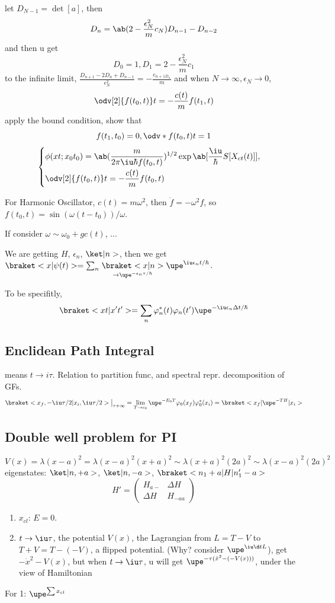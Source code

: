 let $D_{N-1} = \det[a]$, then
\[
  D_n = \ab(2 - \frac{\epsilon_N^2}{m}c_N)D_{n-1} - D_{n-2}
\]
and then u get
\[
  D_0 = 1, D_1 = 2 - \frac{\epsilon_N^2}{m}c_1
\]
to the infinite limit,
$\frac{D_{n+1} - 2D_n + D_{n-1}}{\epsilon_N^2} = -\frac{c_{n+1D_n}}{m}$
and when $N \to \infty, \epsilon_N \to 0$,
\[
  \odv[2]{f(t_0,t)}t = -\frac{c(t)}{m}f(t_1,t)
\]
apply the bound condition, show that
\[
  f(t_1,t_0) = 0,
  \odv*{f(t_0,t)}t = 1
\]
\[
  \begin{cases}
  \begin{aligned}
    & \phi(xt;x_0t_0) =
    \ab(\frac{m}{2\pi\iu\hbar f(t_0,t)})^{1/2}
    \exp\ab[\frac\iu\hbar S[X_{ct}(t)]],\\
    & \odv[2]{f(t_0,t)}t = -\frac{c(t)}{m} f(t_0,t)
  \end{aligned}
  \end{cases}
\]

For Harmonic Oscillator, $c(t) = m\omega^2$, then
$\ddot f = -\omega^2 f$, so $f(t_0,t) = \sin(\omega(t - t_0))/\omega$.

If consider $\omega \sim \omega_0 + gc(t)$, ...

We are getting $H$, $\epsilon_n$, $\ket|n>$, then we get
$\braket<x|\psi(t)> = \sum_n \underset{\to \upe^{-\epsilon_n\tau/\hbar}}{\braket<x|n>}\upe^{\iu\epsilon_nt/\hbar}$.

To be specifitly,
\[
  \braket<xt|x't'> = \sum_n \varphi_n^*(t) \varphi_n(t') \upe^{-\iu\epsilon_n\Delta t/\hbar}
\]


\subsection{Enclidean Path Integral}

means $t \to i\tau$. Relation to partition func, and spectral repr. decomposition of GFs.
\[
  \braket<x_f,-\iu \tau/2|x_i,\iu\tau/2>\big|_{\tau+\infty}
= \lim_{T\to c_0} \upe^{-E_0T} \varphi_0 (x_f) \varphi_0^*(x_i)
= \braket<x_f|\upe^{-TH}|x_i>
\]

\subsection{Double well problem for PI}

\[
  V(x) = \lambda (x - a)^2
  = \lambda(x-a)^2(x+a)^2
  \sim \lambda(x+a)^2 (2a)^2
  \sim \lambda(x-a)^2 (2a)^2
\]
eigenstates: $\ket|n,+a>$, $\ket|n,-a>$,
$\braket<n_1+a|H|n_1'-a>$
\[
  H' =
  \begin{pmatrix}
    H_{a-} & \Delta H\\
    \Delta H & H_{-aa}
  \end{pmatrix}
\]
\begin{enumerate}
  \item $x_{cl}$: $E = 0$.
  \item $t \to \iu\tau$, the potential $V(x)$, the Lagrangian from $L = T - V$ to $T + V = T - (-V)$, a flipped potential.
  (Why? consider $\upe^{\iu\d t L}$), get $-\dot x^2 -V(x)$, but when $t \to \iu\tau$, u will get $\upe^{-\tau (\dot x^2 -(-V(x)))}$, under the view of Hamiltonian
\end{enumerate}
For 1: $\upe^{\sum x_{cl}}$

